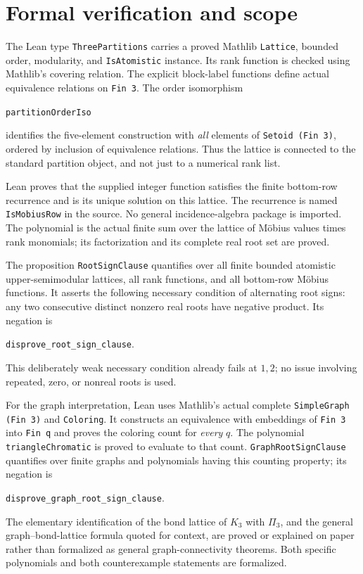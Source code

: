 \documentclass[11pt]{article}
\begin{document}
\section*{Formal verification and scope}
The Lean type \texttt{ThreePartitions} carries a proved Mathlib
\texttt{Lattice}, bounded order, modularity, and
\texttt{IsAtomistic} instance. Its rank function is checked using
Mathlib's covering relation. The explicit block-label functions define
actual equivalence relations on \texttt{Fin 3}. The order isomorphism
\begin{center}\small\texttt{partitionOrderIso}\end{center}
identifies the five-element construction with \emph{all} elements of
\texttt{Setoid (Fin 3)}, ordered by inclusion of equivalence relations.
Thus the lattice is connected to the standard partition object, and
not just to a numerical rank list.

Lean proves that the supplied integer function satisfies the finite
bottom-row recurrence and is its unique solution on this lattice.
The recurrence is named \texttt{IsMobiusRow} in the source.
No general incidence-algebra package is imported.
The polynomial is the actual finite sum over the lattice of M\"obius
values times rank monomials; its factorization and its complete real
root set are proved.

\begin{samepage}
The proposition \texttt{RootSignClause} quantifies over all finite
bounded atomistic upper-semimodular lattices, all rank functions, and
all bottom-row M\"obius functions. It asserts the following necessary
condition of alternating root signs: any two consecutive distinct
nonzero real roots have negative product. Its negation is
\begin{center}\small\texttt{disprove\_root\_sign\_clause}.\end{center}
\end{samepage}
This deliberately weak necessary condition already fails at $1,2$;
no issue involving repeated, zero, or nonreal roots is used.

For the graph interpretation, Lean uses Mathlib's actual complete
\texttt{SimpleGraph (Fin 3)} and \texttt{Coloring}. It constructs an
equivalence with embeddings of \texttt{Fin 3} into \texttt{Fin q}
and proves the coloring count for \emph{every} $q$. The polynomial
\texttt{triangleChromatic} is proved to evaluate to that count.
\texttt{GraphRootSignClause} quantifies over finite graphs and
polynomials having this counting property; its negation is
\begin{center}\small\texttt{disprove\_graph\_root\_sign\_clause}.\end{center}
The elementary identification of the bond lattice of $K_3$ with
$\Pi_3$, and the general graph--bond-lattice formula quoted for
context, are proved or explained on paper rather than formalized as
general graph-connectivity theorems. Both specific polynomials and
both counterexample statements are formalized.
\end{document}
